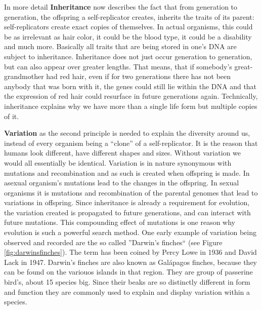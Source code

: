 \documentclass[12pt,oneside,listof=totoc,paper=a4,headings=small]{scrbook}
\begin{document}
In more detail \textbf{Inheritance} now describes the fact that from generation to generation, the offspring a self-replicator creates, inherits the traits of its parent: self-replicators create exact copies of themselves. In actual organisms, this could be as irrelevant as hair color, it could be the blood type, it could be a disability and much more. Basically all traits that are being stored in one's DNA are subject to inheritance. Inheritance does not just occur generation to generation, but can also appear over greater lengths. That means, that if somebody's great-grandmother had red hair, even if for two generations there has not been anybody that was born with it, the genes could still lie within the DNA and that the expression of red hair could resurface in future generations again.
Technically, inheritance explains why we have more than a single life form but multiple copies of it.


\newpage
\textbf{Variation} as the second principle is needed to explain the diversity around us, instead of every organism being a ``clone'' of a self-replicator. It is the reason that humans look different, have different shapes and sizes. Without variation we would all essentially be identical. Variation is in nature synonymous with mutations and recombination and as such is created when offspring is made. In asexual organism's mutations lead to the changes in the offspring. In sexual organisms it is mutations and recombination of the parental genomes that lead to variations in offspring. Since inheritance is already a requirement for evolution, the variation created is propagated to future generations, and can interact with future mutations. This compounding effect of mutations is one reason why evolution is such a powerful search method. One early example of variation being observed and recorded are the so called ''Darwin's finches`` (see Figure \ref{fig:darwinsfinches}). The term has been coined by Percy Lowe in 1936 and David Lack in 1947. Darwin's finches are also known as Galápagos finches, because they can be found on the variouos islands in that region. They are group of passerine bird's, about 15 species big. Since their beaks are so distinctly different in form and function they are commonly used to explain and display variation within a species. 
\end{document}
